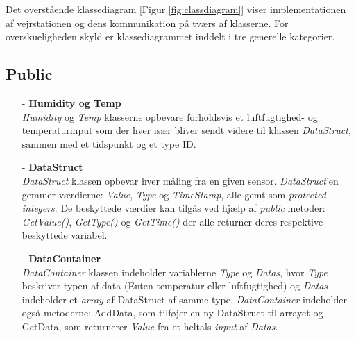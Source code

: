 \noindent
Det overstående klassediagram [Figur \ref{fig:classdiagram}] viser implementationen af vejrstationen og dens kommunikation på tværs af klasserne. For overskueligheden skyld er klassediagrammet inddelt i tre generelle kategorier.

\subsection{Public}
\begin{itemize}
    \item[-] \textbf{Humidity og Temp} \hfill \\
    \textit{Humidity} og \textit{Temp} klasserne opbevare forholdsvis et luftfugtighed- og temperaturinput som der hver især bliver sendt videre til klassen \textit{DataStruct}, sammen med et tidspunkt og et type ID. 
    
    \item[-] \textbf{DataStruct} \hfill \\
    \textit{DataStruct} klassen opbevar hver måling fra en given sensor. \textit{DataStruct}'en gemmer værdierne: \textit{Value}, \textit{Type} og \textit{TimeStamp}, alle gemt som \textit{protected integers}. De beskyttede værdier kan tilgås ved hjælp af \textit{public} metoder: \textit{GetValue()}, \textit{GetType()} og \textit{GetTime()} der alle returner deres respektive beskyttede variabel.
    
    \item[-] \textbf{DataContainer} \hfill \\
    \textit{DataContainer} klassen indeholder variablerne \textit{Type} og \textit{Datas}, hvor \textit{Type} beskriver typen af data (Enten temperatur eller luftfugtighed) og \textit{Datas} indeholder et \textit{array} af DataStruct af samme type.  \textit{DataContainer} indeholder også metoderne: AddData, som tilføjer en ny DataStruct til arrayet og GetData, som returnerer \textit{Value} fra et heltals \textit{input} af \textit{Datas}.
\end{itemize}

